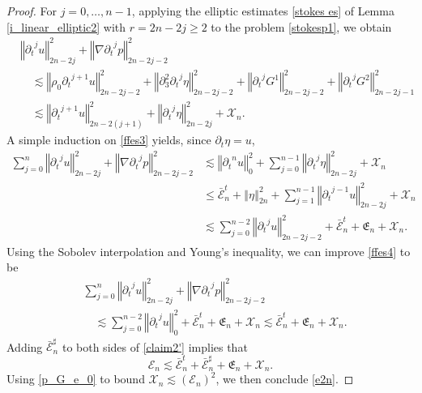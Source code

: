 \documentclass[a4paper,reqno,11pt]{amsart}
\numberwithin{equation}{section}
\providecommand{\norm}[1]{\left\Vert#1\right\Vert}
\providecommand{\ns}[1]{\norm{#1}^2}
\providecommand{\norm}[1]{\left\Vert#1\right\Vert}
\begin{document}
\begin{proof}
For $j=0,\dots,n-1$, applying the elliptic estimates \eqref{stokes es} of Lemma \ref{i_linear_elliptic2} with $r=2n-2j \ge 2$ to the problem \eqref{stokesp1}, we obtain
\begin{equation}\label{ffes3}
\begin{split}
 &\norm{{\partial_t}^j  u  }_{2n-2j}^2 + \norm{\nabla {\partial_t}^j  p  }_{2n-2j-2}^2
 \\  &\quad{\lesssim}
\norm{\rho_0{\partial_t}^{j+1} u   }_{2n-2j-2 }^2+\norm{ {\partial}_{3}^2 {\partial_t}^{j} \eta}_{2n-2j-2 }^2+ \norm{ {\partial_t}^j G^1   }_{2n-2j-2}^2
+ \norm{{\partial_t}^j  G^2  }_{2n-2j-1}^2
  \\&\quad{\lesssim}   \norm{{\partial_t}^{j+1} u   }_{2n-2(j+1) }^2 +\norm{   {\partial_t}^{j} \eta}_{2n-2j  }^2   +  {\mathcal{X}}_n.
\end{split}
\end{equation}
A simple induction on \eqref{ffes3} yields, since ${\partial_t}\eta=u$,
\begin{equation}\label{ffes4}
\begin{split}
\sum_{j=0}^{n}\norm{ {\partial_t}^j u  }_{2n-2j }^2+ \norm{\nabla {\partial_t}^j  p  }_{2n-2j-2}^2
 &  {\lesssim} \ns{{\partial_t}^{n} u}_{0} +\sum_{j=0}^{n-1}\norm{ {\partial_t}^j \eta  }_{2n-2j }^2 +  {\mathcal{X}}_n
\\&   \le \bar{\mathcal{E}}_n^t +\norm{  \eta  }_{2n  }^2 +\sum_{j=1}^{n-1}\norm{ {\partial_t}^{j-1} u  }_{2n-2j }^2   + {\mathcal{X}}_n
\\&  {\lesssim}  \sum_{j=0}^{n-2}\norm{ {\partial_t}^{j} u  }_{2n-2j-2}^2     +\bar{\mathcal{E}}_n^t  +\mathfrak{E}_n +  {\mathcal{X}}_n.
\end{split}
\end{equation}
Using the Sobolev interpolation and Young's inequality, we can improve \eqref{ffes4} to be
\begin{equation}\label{claim2'}
\begin{split}
&  \sum_{j=0}^{n}\norm{ {\partial_t}^j u  }_{2n-2j }^2+   \norm{\nabla {\partial_t}^j  p  }_{2n-2j-2}^2
\\&\quad {\lesssim}  \sum_{j=0}^{n-2}\norm{ {\partial_t}^{j} u  }_{0}^2   + \bar{\mathcal{E}}_n^t +\mathfrak{E}_n +  {\mathcal{X}}_n
{\lesssim}   \bar{\mathcal{E}}_n^t  +\mathfrak{E}_n +  {\mathcal{X}}_n.
\end{split}
\end{equation}
Adding $\bar{\mathcal{E}}_n^\sharp$ to both sides of \eqref{claim2'} implies that
\begin{equation}\label{claim12}
{\mathcal{E}}_{n}  \lesssim
 \bar{\mathcal{E}}_{n}^t   +\bar{\mathcal{E}}_n^\sharp+ \mathfrak{E}_{n} +  {\mathcal{X}}_n.
\end{equation}
Using \eqref{p_G_e_0} to bound $\mathcal{X}_{n} \lesssim  (\mathcal{E}_{n} )^{2}$, we then conclude \eqref{e2n}.
\end{proof}
\end{document}
